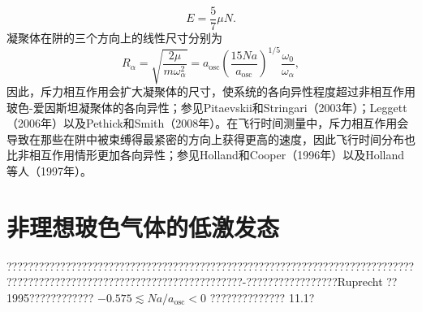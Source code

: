 \begin{equation}\tag{11.2.27}\label{eq:11.2.27}
E = \frac { 5 } { 7 } \mu N .
\end{equation}
凝聚体在阱的三个方向上的线性尺寸分别为
\begin{equation}\tag{11.2.28}\label{eq:11.2.28}
R _ { \alpha } = \sqrt { \frac { 2 \mu } { m \omega _ { \alpha } ^{2} } } = a _ { \mathrm { o s c } } \left( \frac { 15 N a } { a _ { \mathrm { o s c } } } \right) ^{1 / 5} \frac { \omega _ { 0 } } { \omega _ { \alpha } } ,
\end{equation}
因此，斥力相互作用会扩大凝聚体的尺寸，使系统的各向异性程度超过非相互作用玻色-爱因斯坦凝聚体的各向异性；参见Pitaevskii和Stringari（2003年）；Leggett（2006年）以及Pethick和Smith（2008年）。在飞行时间测量中，斥力相互作用会导致在那些在阱中被束缚得最紧密的方向上获得更高的速度，因此飞行时间分布也比非相互作用情形更加各向异性；参见Holland和Cooper（1996年）以及Holland等人（1997年）。
\section{非理想玻色气体的低激发态}\label{ux975eux7406ux60f3ux73bbux8272ux6c14ux4f53ux7684ux4f4eux6fc0ux53d1ux6001}
????????????????????????????????????????????????????????????????????????????????????????????????????????????????????????-?????????????????Ruprecht ??1995???????????? \(-0.575 \lesssim Na/a_{\mathrm{osc}} < 0\) ?????????????? 11.1?

